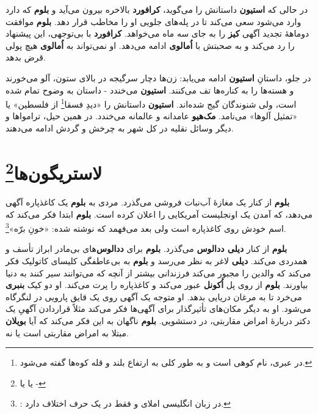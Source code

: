 \documentclass[12pt]{book}
\newcommand{\noun}[1]{{\textbf{#1}}}
\begin{document}
    در حالی که \noun{استیون} داستانش را می‌گوید، \noun{کرافورد} بالاخره بیرون می‌آید و \noun{بلوم} که دارد وارد می‌شود سعی می‌کند تا در پله‌های جلویی او را مخاطب قرار دهد. \noun{بلوم} موافقت دوماههٔ تجدید آگهی \noun{کیز} را به جای سه ماه می‌خواهد. \noun{کرافورد} با بی‌توجهی، این پیشنهاد را رد می‌کند و به صحبتش با \noun{اُمالوی} ادامه می‌دهد. او نمی‌تواند به \noun{اُمالوی} هیچ پولی قرض بدهد.

    در جلو، داستانِ \noun{استیون} ادامه می‌یابد: زن‌ها دچار سرگیجه در بالای ستون، آلو می‌خورند و هسته‌ها را به کناره‌ها تف می‌کنند. \noun{استیون} می‌خندد - داستان به وضوح تمام شده است، ولی شنوندگان گیج شده‌اند. \noun{استیون} داستانش را «دیدِ فسقا\footnote{در عبری، نام کوهی است و به طور کلی به ارتفاع بلند و قله کوه‌ها گفته می‌شود.} از فلسطین» یا «تمثیل آلوها» می‌نامد. \noun{مک‌هیو} عامدانه و عالمانه می‌خندد. در همین حیل، ترامواها و دیگر وسائل نقلیه در کل شهر به چرخش و گردش ادامه می‌دهند.

    \chapter[لاستریگون‌ها]{لاستریگون‌ها\protect\footnote{ یا  یا -}}\label{ep:8}
    \noun{بلوم} از کنار یک مغازهٔ آب‌نبات فروشی می‌گذرد. مردی به \noun{بلوم} یک کاغذپاره آگهی می‌دهد، که آمدن یک اونجلیست آمریکایی را اعلان کرده است. \noun{بلوم} ابتدا فکر می‌کند که اسم خودش روی کاغذپاره است ولی بعد می‌فهمد که نوشته شده: «خونِ برّه»\footnote{: در زبان انگلیسی املای  و  فقط در یک حرف اختلاف دارد.}.

    \noun{بلوم} از کنار \noun{دیلی ددالوس} می‌گذرد. \noun{بلوم} برای \noun{ددالوس}‌های بی‌مادر ابراز تأسف و همدردی می‌کند. \noun{دیلی} لاغر به نظر می‌رسد و \noun{بلوم} به بی‌عاطفگی کلیسای کاتولیک فکر می‌کند که والدین را مجبور می‌کند فرزندانی بیشتر از آنچه که می‌توانند سیر کنند به دنیا بیاورند. \noun{بلوم} از روی پل \noun{اُکونل} عبور می‌کند و کاغذپاره را پرت می‌کند. او دو کیک \noun{بنبری} می‌خرد تا به مرغان دریایی بدهد. او متوجه یک آگهی روی یک قایق پارویی در لنگرگاه می‌شود. او به دیگر مکان‌های تأثیرگذار برای آگهی‌ها فکر می‌کند مثلاً قراردادن آگهیِ یک دکتر دربارهٔ امراض مقاربتی، در دستشویی. \noun{بلوم} ناگهان به این فکر می‌کند که آیا \noun{بویلان} مبتلا به امراض مقاربتی است یا نه.
\end{document}
